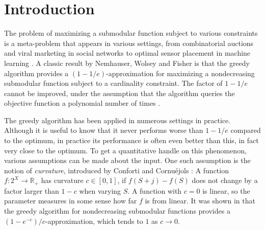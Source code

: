 \documentclass{article}
\newcommand{\reals}{\ensuremath{\mathbb{R}}}
\theoremstyle{definition}
\begin{document}
\newcommand{\NOsubmod}{h}
\newcommand{\NOsubmodEst}{\tilde{\NOsubmod}}
\newcommand{\pot}{\psi}
\newcommand{\potEst}{\tilde{\pot}}
\newcommand{\sinit}{S_{0}}

\newcommand{\comp}[1]{\overline{#1}}
\newcommand{\compf}{\comp{f}}
\newcommand{\Mdual}{\M^{*}}
\newcommand{\Bdual}{\B^{*}}
\newcommand{\Odual}{O^{*}}
\newcommand{\Idual}{\I^{*}}
\newcommand{\Sdual}{S^{*}}
\newcommand{\fdual}{f^{*}}
\newcommand{\cinv}{(1 - c)^{-1}}
\newcommand{\NOLS}{\textsc{NOLS}}
\newcommand{\SubmodMax}{\textsc{SubmodMax}}
\newcommand{\SupmodMin}{\textsc{SupmodMin}}

\newcommand{\be}{\mathbf e}
\newcommand{\bc}{\mathbf c}
\newcommand{\bx}{\mathbf x}
\newcommand{\by}{\mathbf y}
\newcommand{\bv}{\mathbf v}
\newcommand{\proj}{\mathsf{proj}}
\newcommand{\dist}{\mathsf{dist}}
\newcommand{\spn}{\mathsf{span}}

\section{Introduction}
\label{sec:introduction}

The problem of maximizing a submodular function subject to various constraints is a meta-problem that appears in various settings, from combinatorial auctions \cite{LLN06,DNS05,Vondrak2008} and viral marketing in social networks \cite{KKT03} to optimal sensor placement in machine learning \cite{KGGK06,KSG08,KRGG09,KG11}. A classic result by Nemhauser, Wolsey and Fisher \cite{Nemhauser1978a} is that the greedy algorithm provides a $(1-1/e)$-approximation for maximizing a nondecreasing submodular function subject to a cardinality constraint. The factor of $1-1/e$ cannot be improved, under the assumption that the algorithm queries the objective function a polynomial number of times \cite{Nemhauser1978}. 

The greedy algorithm has been applied in numerous settings in practice. Although it is useful to know that it never performs worse than $1-1/e$ compared to the optimum, in practice its performance is often even better than this, in fact very close to the optimum. To get a quantitative handle on this phenomenon, various assumptions can be made about the input. One such assumption is the notion of {\em curvature}, introduced by Conforti and Cornu\'ejols \cite{Conforti1984}: A function $f:2^X \rightarrow \reals_+$ has curvature $c \in [0,1]$, if $f(S+j) - f(S)$ does not change by a factor larger than $1-c$ when varying $S$. A function with $c=0$ is linear, so the parameter measures in some sense how far $f$ is from linear. It was shown in \cite{Conforti1984} that the greedy algorithm for nondecreasing submodular functions provides a $(1-e^{-c})/c$-approximation, which tends to $1$ as $c \rightarrow 0$.
\end{document}
